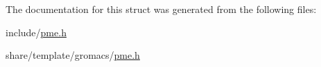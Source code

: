 \-The documentation for this struct was generated from the following files\-:\begin{DoxyCompactItemize}
\item 
include/\hyperlink{include_2pme_8h}{pme.\-h}\item 
share/template/gromacs/\hyperlink{share_2template_2gromacs_2pme_8h}{pme.\-h}\end{DoxyCompactItemize}
